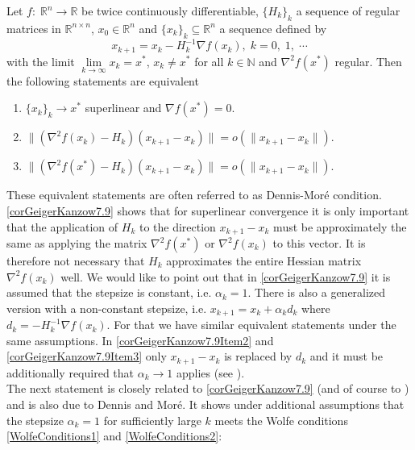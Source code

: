 \begin{corollary}\label{corGeigerKanzow7.9}
    Let $f \colon \; \mathbb{R}^n \to \mathbb{R}$ be twice continuously differentiable, $\{H_k\}_k$ a sequence of regular matrices in $\mathbb{R}^{n \times n}$, $x_0 \in \mathbb{R}^n$ and $\{x_k\}_k \subseteq \mathbb{R}^n$ a sequence defined by
    \begin{equation*}
        x_{k+1} = x_k - H^{-1}_k \nabla f(x_k), \; k=0, \; 1,\; \cdots
    \end{equation*}
    with the limit $\lim\limits_{k \rightarrow \infty}{x_k} = x^*$, $x_k \neq x^*$ for all $k \in \mathbb{N}$ and $\nabla^2 f(x^*)$ regular. Then the following statements are equivalent
    \begin{enumerate}
        \item $\{x_k\}_k \to x^*$ superlinear and $\nabla f(x^*) = 0$.
        \item $\lVert (\nabla^2 f(x_k) - H_k)(x_{k+1}-x_k) \rVert = o( \lVert x_{k+1}-x_k \rVert )$. \label{corGeigerKanzow7.9Item2}
        \item $\lVert (\nabla^2 f(x^*) - H_k)(x_{k+1}-x_k) \rVert = o( \lVert x_{k+1}-x_k \rVert )$. \label{corGeigerKanzow7.9Item3}
    \end{enumerate}
\end{corollary}

These equivalent statements are often referred to as Dennis-Mor\'{e} condition. \cref{corGeigerKanzow7.9} shows that for superlinear convergence it is only important that the application of $H_k$ to the direction $x_{k+1}-x_k$ must be approximately the same as applying the matrix $\nabla^2 f(x^*)$ or $\nabla^2 f(x_k)$ to this vector. It is therefore not necessary that $H_k$ approximates the entire Hessian matrix $\nabla^2 f(x_k)$ well. We would like to point out that in \cref{corGeigerKanzow7.9} it is assumed that the stepsize is constant, i.e. $\alpha_k = 1$. There is also a generalized version with a non-constant stepsize, i.e. $x_{k+1} = x_k + \alpha_k d_k$ where $d_k = - H^{-1}_k \nabla f(x_k)$. For that we have similar equivalent statements under the same assumptions. In \cref{corGeigerKanzow7.9Item2} and \cref{corGeigerKanzow7.9Item3} only $x_{k+1}-x_k$ is replaced by $d_k$ and it must be additionally required that $\alpha_k \rightarrow 1$ applies (see \cite[Aufgabe~7.4.]{GeigerKanzow:1999}). \\
The next statement is closely related to \cref{corGeigerKanzow7.9} (and of course to \cite[Aufgabe~7.4.]{GeigerKanzow:1999}) and is also due to Dennis and Mor\'{e}. It shows under additional assumptions that the stepsize $\alpha_k = 1$ for sufficiently large $k$ meets the Wolfe conditions \cref{WolfeConditions1} and \cref{WolfeConditions2}:

